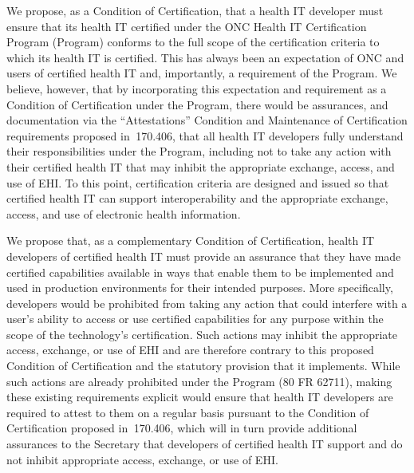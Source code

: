 \documentclass[twoside,11pt]{article}
\begin{document}
          We propose, as a Condition of Certification, that a health IT developer must ensure that its health IT certified under the ONC Health IT Certification Program (Program) conforms to the full scope of the certification criteria to which its health IT is certified. This has always been an expectation of ONC and users of certified health IT and, importantly, a requirement of the Program. We believe, however, that by incorporating this expectation and requirement as a Condition of Certification under the Program, there would be assurances, and documentation via the “Attestations” Condition and Maintenance of Certification requirements proposed in \textsection{} 170.406, that all health IT developers fully understand their responsibilities under the Program, including not to take any action with their certified health IT that may inhibit the appropriate exchange, access, and use of EHI. To this point, certification criteria are designed and issued so that certified health IT can support interoperability and the appropriate exchange, access, and use of electronic health information. \ifhmode\expandafter\xspace\fi 
          


          We propose that, as a complementary Condition of Certification, health IT developers of certified health IT must provide an assurance that they have made certified capabilities available in ways that enable them to be implemented and used in production environments for their intended purposes. More specifically, developers would be prohibited from taking any action that could interfere with a user's ability to access or use certified capabilities for any purpose within the scope of the technology's certification. Such actions may inhibit the appropriate access, exchange, or use of EHI and are therefore contrary to this proposed Condition of Certification and the statutory provision that it implements. While such actions are already prohibited under the Program (80 FR 62711), making these existing requirements explicit would ensure that health IT developers are required to attest to them on a regular basis pursuant to the Condition of Certification proposed in \textsection{} 170.406, which will in turn provide additional assurances to the Secretary that developers of certified health IT support and do not inhibit appropriate access, exchange, or use of EHI.
\end{document}
